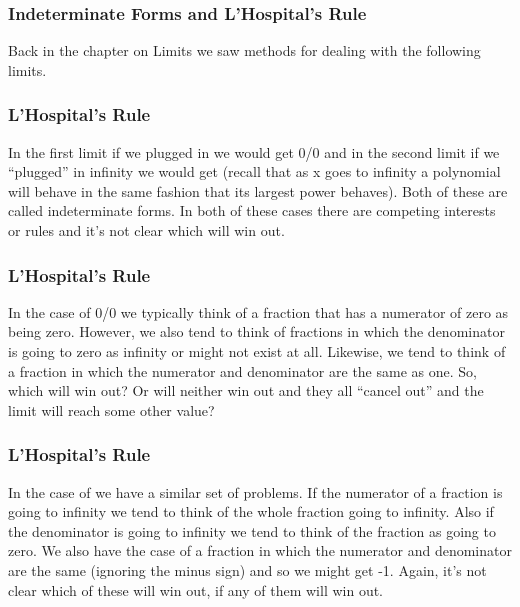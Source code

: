 \documentclass{beamer}
\begin{document}
	\begin{frame}
\frametitle{Indeterminate Forms and L’Hospital’s Rule}
Back in the chapter on Limits we saw methods for dealing with the following limits.


\end{frame}
\begin{frame}
\frametitle{L’Hospital’s Rule}
\large

 
 
In the first limit if we plugged in  we would get 0/0 and in the second limit if we “plugged” in infinity we would get  (recall that as x goes to infinity a polynomial will behave in the same fashion that its largest power behaves).  Both of these are called indeterminate forms.  In both of these cases there are competing interests or rules and it’s not clear which will win out.
\end{frame}
\begin{frame}
	\frametitle{L’Hospital’s Rule}
	\large
In the case of 0/0 we typically think of a fraction that has a numerator of zero as being zero.  However, we also tend to think of fractions in which the denominator is going to zero as infinity or might not exist at all.  Likewise, we tend to think of a fraction in which the numerator and denominator are the same as one.  So, which will win out?  Or will neither win out and they all “cancel out” and the limit will reach some other value?
\end{frame}
\begin{frame}
	\frametitle{L’Hospital’s Rule}
	\large 
In the case of  we have a similar set of problems.  If the numerator of a fraction is going to infinity we tend to think of the whole fraction going to infinity.  Also if the denominator is going to infinity we tend to think of the fraction as going to zero.  We also have the case of a fraction in which the numerator and denominator are the same (ignoring the minus sign) and so we might get -1.  Again, it’s not clear which of these will win out, if any of them will win out.
\end{frame}
\end{document}
